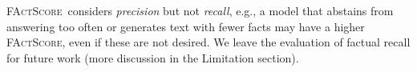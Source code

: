 \documentclass[11pt]{article}
\newcommand{\ours}{\textsc{FActScore}}
\newcommand{\subjectLM}{LM$_\textsc{subj}$}
\newcommand{\sewon}[1]{\textcolor{magenta}{[Sewon: #1]}
}
\newcommand{\kalpesh}[1]{\textcolor{brown}{[Kalpesh: #1]}
}
\newcommand{\mohit}[1]{\textcolor{blue}{[Mohit: #1]}
}
\newcommand{\hanna}[1]{\textcolor{red}{[Hanna: #1]}
}
\begin{document}
\ours\ considers {\em precision} but not {\em recall}, e.g., a model that abstains from answering too often or generates text with fewer facts may have a higher \ours, even if these are not desired.
We leave the evaluation of factual recall for future work (more discussion in the Limitation section). %


\end{document}
